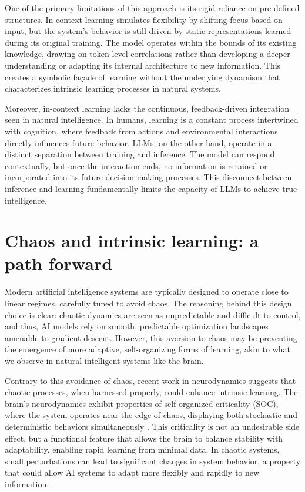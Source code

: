 \documentclass{article}
\begin{document}
One of the primary limitations of this approach is its rigid reliance
on pre-defined structures. In-context learning simulates flexibility
by shifting focus based on input, but the system’s behavior is still
driven by static representations learned during its original training. The
model operates within the bounds of its existing knowledge, drawing on
token-level correlations rather than developing a deeper understanding
or adapting its internal architecture to new information. This creates
a symbolic façade of learning without the underlying dynamism that
characterizes intrinsic learning processes in natural systems.

Moreover, in-context learning lacks the continuous, feedback-driven
integration seen in natural intelligence. In humans, learning is a
constant process intertwined with cognition, where feedback from actions
and environmental interactions directly influences future behavior. LLMs,
on the other hand, operate in a distinct separation between training and
inference. The model can respond contextually, but once the interaction
ends, no information is retained or incorporated into its future
decision-making processes. This disconnect between inference and learning
fundamentally limits the capacity of LLMs to achieve true intelligence.


\section{Chaos and intrinsic learning: a path forward}

Modern artificial intelligence systems are typically designed to
operate close to linear regimes, carefully tuned to avoid chaos. The
reasoning behind this design choice is clear: chaotic dynamics are seen
as unpredictable and difficult to control, and thus, AI models rely
on smooth, predictable optimization landscapes amenable to
gradient descent. However, this aversion to chaos may be preventing the
emergence of more adaptive, self-organizing forms of learning, akin to
what we observe in natural intelligent systems like the brain.

Contrary to this avoidance of chaos, recent work in neurodynamics suggests
that chaotic processes, when harnessed properly, could enhance intrinsic
learning. The brain's neurodynamics exhibit properties of self-organized
criticality (SOC), where the system operates near the edge of chaos,
displaying both stochastic and deterministic behaviors simultaneously
\cite{Habibollahi2023,ovchinnikov2021,Ovchinnikov_2016}. This criticality
is not an undesirable side effect, but a functional feature that allows
the brain to balance stability with adaptability, enabling rapid learning
from minimal data. In chaotic systems, small perturbations can lead to
significant changes in system behavior, a property that could allow AI
systems to adapt more flexibly and rapidly to new information.
\end{document}
